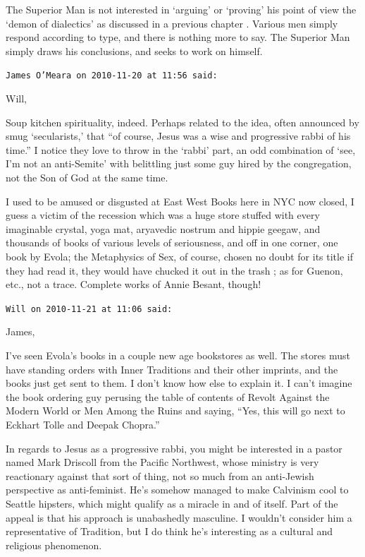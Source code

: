 \begin{footnotesize}
\begin{sffamily}
The Superior Man is not interested in `arguing' or `proving' his point of view the `demon of dialectics' as discussed in a previous chapter . Various men simply respond according to type, and there is nothing more to say. The Superior Man simply draws his conclusions, and seeks to work on himself.

\hfill

\texttt{James O'Meara on 2010-11-20 at 11:56 said:}

Will,

Soup kitchen spirituality, indeed. Perhaps related to the idea, often announced by smug `secularists,' that ``of course, Jesus was a wise and progressive rabbi of his time.'' I notice they love to throw in the `rabbi' part, an odd combination of `see, I'm not an anti-Semite' with belittling just some guy hired by the congregation, not the Son of God at the same time.

I used to be amused or disgusted at East West Books here in NYC now closed, I guess a victim of the recession which was a huge store stuffed with every imaginable crystal, yoga mat, aryavedic nostrum and hippie geegaw, and thousands of books of various levels of seriousness, and off in one corner, one book by Evola; the Metaphysics of Sex, of course, chosen no doubt for its title if they had read it, they would have chucked it out in the trash ; as for Guenon, etc., not a trace. Complete works of Annie Besant, though!

\hfill

\texttt{Will on 2010-11-21 at 11:06 said:}

James,

I've seen Evola's books in a couple new age bookstores as well. The stores must have standing orders with Inner Traditions and their other imprints, and the books just get sent to them. I don't know how else to explain it. I can't imagine the book ordering guy perusing the table of contents of Revolt Against the Modern World or Men Among the Ruins and saying, ``Yes, this will go next to Eckhart Tolle and Deepak Chopra.''

In regards to Jesus as a progressive rabbi, you might be interested in a pastor named Mark Driscoll from the Pacific Northwest, whose ministry is very reactionary against that sort of thing, not so much from an anti-Jewish perspective as anti-feminist. He's somehow managed to make Calvinism cool to Seattle hipsters, which might qualify as a miracle in and of itself. Part of the appeal is that his approach is unabashedly masculine. I wouldn't consider him a representative of Tradition, but I do think he's interesting as a cultural and religious phenomenon.


\end{sffamily}
\end{footnotesize}
